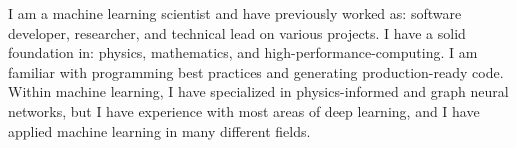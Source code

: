 



I am a machine learning scientist and have previously worked as: software developer, researcher, and technical lead on various projects.
I have a solid foundation in: physics, mathematics, and high-performance-computing.
I am familiar with programming best practices and generating production-ready code.
Within machine learning, I have specialized in physics-informed and graph neural networks, but I have experience with most areas of deep learning, and I have applied machine learning in many different fields.



